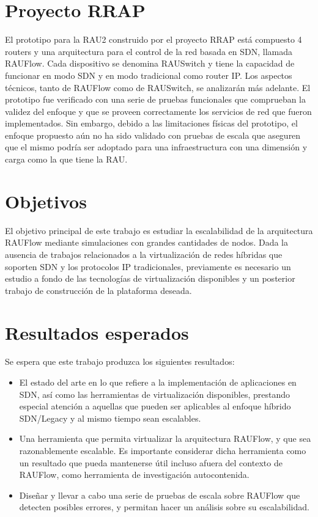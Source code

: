 \section{Proyecto RRAP}
El prototipo para la RAU2 construido por el proyecto RRAP \cite{proyecto-rrap} está compuesto 4 routers y una arquitectura para el control de la red basada en SDN, llamada RAUFlow. Cada dispositivo se denomina RAUSwitch y tiene la capacidad de funcionar en modo SDN y en modo tradicional como router IP. Los aspectos técnicos, tanto de RAUFlow como de RAUSwitch, se analizarán más adelante.
El prototipo fue verificado con una serie de pruebas funcionales que comprueban la validez del enfoque y que se proveen correctamente los servicios de red que fueron implementados.
Sin embargo, debido a las limitaciones físicas del prototipo, el enfoque propuesto aún no ha sido validado con pruebas de escala que aseguren que el mismo podría ser adoptado para una infraestructura con una dimensión y carga como la que tiene la RAU.

\section{Objetivos}
El objetivo principal de este trabajo es estudiar la escalabilidad de la arquitectura RAUFlow mediante simulaciones con grandes cantidades de nodos. Dada la ausencia de trabajos relacionados a la virtualización de redes híbridas que soporten SDN y los protocolos IP tradicionales, previamente es necesario un estudio a fondo de las tecnologías de virtualización disponibles y un posterior trabajo de construcción de la plataforma deseada.

\section{Resultados esperados}
Se espera que este trabajo produzca los siguientes resultados:
\begin{itemize}
	\item El estado del arte en lo que refiere a la implementación de aplicaciones en SDN, así como las herramientas de virtualización disponibles, prestando especial atención a aquellas que pueden ser aplicables al enfoque híbrido SDN/Legacy y al mismo tiempo sean escalables.
	\item Una herramienta que permita virtualizar la arquitectura RAUFlow, y que sea razonablemente escalable. Es importante considerar dicha herramienta como un resultado que pueda mantenerse útil incluso afuera del contexto de RAUFlow, como herramienta de investigación autocontenida.
	\item Diseñar y llevar a cabo una serie de pruebas de escala sobre RAUFlow que detecten posibles errores, y permitan hacer un análisis sobre su escalabilidad.
\end{itemize}

